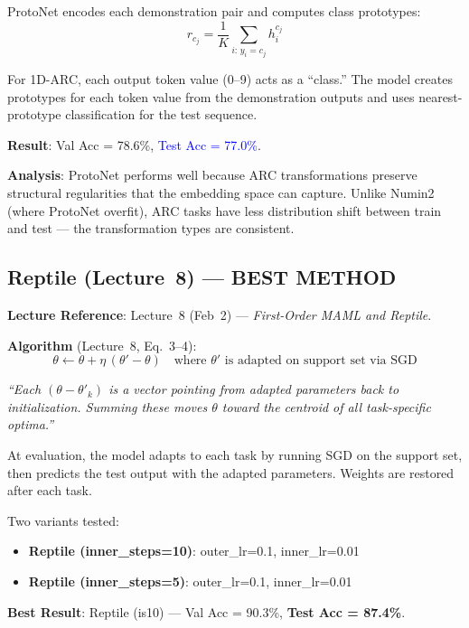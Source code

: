 \documentclass[11pt,a4paper]{article}
\begin{document}
ProtoNet encodes each demonstration pair and computes class prototypes:
\begin{equation}
    r_{c_j} = \frac{1}{K} \sum_{i:\, y_i = c_j} h_i^{c_j}
\end{equation}

For 1D-ARC, each output token value (0--9) acts as a ``class.'' The model creates prototypes for each token value from the demonstration outputs and uses nearest-prototype classification for the test sequence.

\textbf{Result}: Val Acc = 78.6\%, \textcolor{blue}{Test Acc = 77.0\%}.

\textbf{Analysis}: ProtoNet performs well because ARC transformations preserve structural regularities that the embedding space can capture. Unlike Numin2 (where ProtoNet overfit), ARC tasks have less distribution shift between train and test --- the transformation types are consistent.

\subsection{Reptile \textnormal{(Lecture~8)} \textcolor{green!60!black}{--- BEST METHOD}}

\textbf{Lecture Reference}: Lecture~8 (Feb~2) --- \emph{First-Order MAML and Reptile}.

\textbf{Algorithm} (Lecture~8, Eq.~3--4):
\begin{equation}
    \boxed{\theta \leftarrow \theta + \eta \, (\theta' - \theta)} \quad \text{where } \theta' \text{ is adapted on support set via SGD}
\end{equation}

\emph{``Each $(\theta - \theta'_k)$ is a vector pointing from adapted parameters back to initialization. Summing these moves $\theta$ toward the centroid of all task-specific optima.''}

At evaluation, the model adapts to each task by running SGD on the support set, then predicts the test output with the adapted parameters. Weights are restored after each task.

Two variants tested:
\begin{itemize}[nosep]
    \item \textbf{Reptile (inner\_steps=10)}: outer\_lr=0.1, inner\_lr=0.01
    \item \textbf{Reptile (inner\_steps=5)}: outer\_lr=0.1, inner\_lr=0.01
\end{itemize}

\textbf{Best Result}: Reptile (is10) --- Val Acc = 90.3\%, \textcolor{green!60!black}{\textbf{Test Acc = 87.4\%}}.
\end{document}
